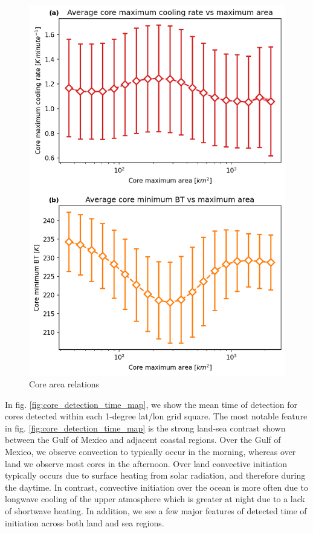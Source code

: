 \begin{figure}[tp]
    \centering
    \includegraphics[width=\textwidth]{figures/ch2_11.png}
    \caption{Core area relations}
    \label{fig:core_area_relations}
\end{figure}

In fig. \ref{fig:core_detection_time_map}, we show the mean time of detection for cores detected within each 1-degree lat/lon grid square.
The most notable feature in fig. \ref{fig:core_detection_time_map} is the strong land-sea contrast shown between the Gulf of Mexico and adjacent coastal regions.
Over the Gulf of Mexico, we observe convection to typically occur in the morning, whereas over land we observe most cores in the afternoon.
Over land convective initiation typically occurs due to surface heating from solar radiation, and therefore during the daytime.
In contrast, convective initiation over the ocean is more often due to longwave cooling of the upper atmosphere which is greater at night due to a lack of shortwave heating.
In addition, we see a few major features of detected time of initiation across both land and sea regions.

